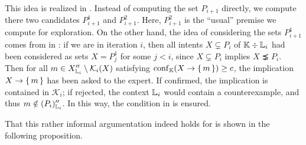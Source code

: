 This idea is realized in .
Instead of computing the set $P_{i+1}$ directly, we compute there two candidates
$P_{i+1}^{1}$ and $P_{i+1}^{2}$.  Here, $P_{i+1}^{2}$ is the \enquote{usual} premise we
compute for exploration.  On the other hand, the idea of considering the sets
$P_{i+1}^{1}$ comes from  in : if
we are in iteration $i$, then all intents $X \subsetneq P_{i}$ of ${\mathbb{K}} \div {\ensuremath{\mathbb{L}}}_{i}$
had been considered as sets $X = P_{j}^{1}$ for some $j < i$, since $X \subsetneq P_{i}$
implies $X \precneq P_{i}$.  Then for all $m \in X_{{\mathbb{L}}_{i}}'' \setminus
\mathcal{K}_{i}(X)$ satisfying $\operatorname{conf}_{{\mathbb{K}}}(X \to {\ensuremath{\{\,m\,\}}}) \ge c$, the implication $X
\to {\ensuremath{\{\,m\,\}}}$ has been asked to the expert.  If confirmed, the implication is contained in
$\mathcal{K}_{i}$; if rejected, the context ${\mathbb{L}}_{i}$ would contain a counterexample,
and thus $m \notin (P_{i})_{{\mathbb{L}}_{i}}''$.  In this way, the condition in  is
ensured.

That this rather informal argumentation indeed holds for
 is shown in the following
proposition.

